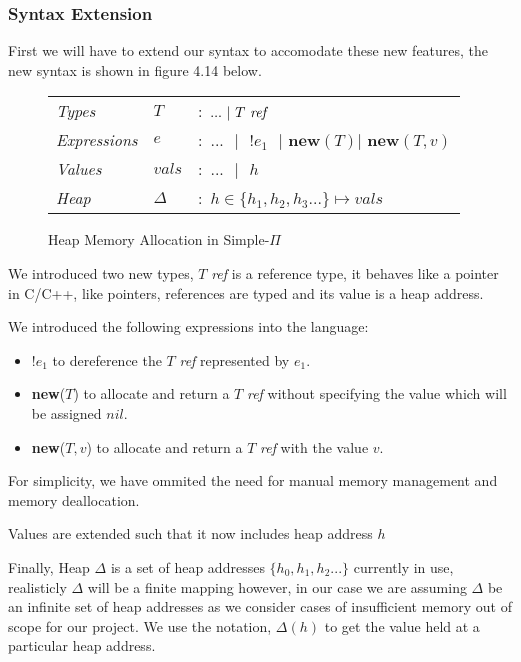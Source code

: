 \documentclass[a4paper,12pt]{report}
\begin{document}
\subsubsection{Syntax Extension}
First we will have to extend our syntax to accomodate these new features, the 
new syntax is shown in figure 4.14 below.

\begin{figure}[H]
  \begin{center}
    \begin{tabular} {l l l}
      \textit{Types} & $T$ & $:$ $...\text{ }|\text{ }T\text{ \textit{ref }}$ \\
      \textit{Expressions} & $e$ & $:$ $...\text{ }|\text{ }!e_1\text{ }|\textbf{ new}(T)|\textbf{ new}(T, v)$\\
     \textit{Values} & $vals$& $:$ $...\text{ }|\text{ }h$ \\
     \textit{Heap} & $\Delta$& $:$ $h \in \{h_1,h_2, h_3...\} \mapsto vals$\\
    \end{tabular}
  \end{center}
  \caption{Heap Memory Allocation in Simple-$\Pi$}
\end{figure}

\par
We introduced two new types, $T$ \textit{ref} is a reference type, it behaves 
like a pointer in C/C++, like pointers, references are typed and its value is a heap address. 


\par
We introduced the following expressions into the language:
\begin{itemize}
  \item $!e_1$ to dereference the $T$ \textit{ref} represented by $e_1$.
  \item \textbf{new}($T$) to allocate and return a $T$ \textit{ref} without specifying the value 
  which will be assigned $nil$.
  \item \textbf{new}($T, v$) to allocate and return a $T$ \textit{ref} with the 
  value $v$.
\end{itemize}
\par
For simplicity, we have ommited the need for manual memory management and memory 
deallocation.

\par
Values are extended such that it now includes heap address $h$

\par
Finally, Heap $\Delta$ is a set of heap addresses $\{h_0, h_1, h_2...\}$ currently in use, 
realisticly $\Delta$ will be a finite mapping however, in our case we are assuming 
$\Delta$ be an infinite set of heap addresses as we consider cases of 
insufficient memory out of scope for our project. We use the notation, $\Delta(h)$ 
to get the value held at a particular heap address. 
\end{document}
